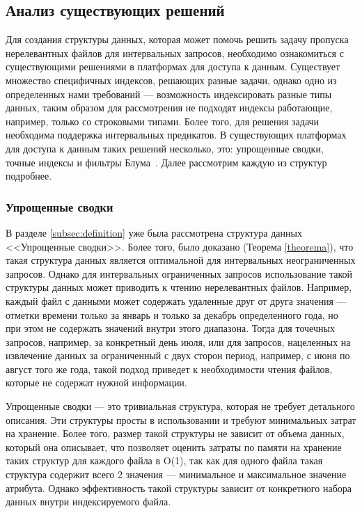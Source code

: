 \subsection{Анализ существующих решений}\label{subsec:indexes}

Для создания структуры данных, которая может помочь решить задачу пропуска нерелевантных файлов для интервальных запросов, необходимо ознакомиться с существующими решениями в платформах для доступа к данным. Существует множество специфичных индексов, решающих разные задачи, однако одно из определенных нами требований --- возможность индексировать разные типы данных, таким образом для рассмотрения не подходят индексы работающие, например, только со строковыми типами. Более того, для решения задачи необходима поддержка интервальных предикатов. В существующих платформах для доступа к данным таких решений несколько, это: упрощенные сводки, точные индексы и фильтры Блума~\cite{Extensible_data_skipping}. Далее рассмотрим каждую из структур подробнее.

\subsubsection{Упрощенные сводки}\label{subsubsec:column_stats}

В разделе \ref{subsec:definition} уже была рассмотрена структура данных {<<Упрощенные сводки>>}. Более того, было доказано (Теорема \ref{theorema}), что такая структура данных является оптимальной для интервальных неограниченных запросов. Однако для интервальных ограниченных запросов использование такой структуры данных может приводить к чтению нерелевантных файлов. Например, каждый файл с данными может содержать удаленные друг от друга значения --- отметки времени только за январь и только за декабрь определенного года, но при этом не содержать значений внутри этого диапазона. Тогда для точечных запросов, например, за конкретный день июля, или для запросов, нацеленных на извлечение данных за ограниченный с двух сторон период, например, с июня по август того же года, такой подход приведет к необходимости чтения файлов, которые не содержат нужной информации.

Упрощенные сводки --- это тривиальная структура, которая не требует детального описания. Эти структуры просты в использовании и требуют минимальных затрат на хранение. Более того, размер такой структуры не зависит от объема данных, который она описывает, что позволяет оценить затраты по памяти на хранение таких структур для каждого файла в O(1), так как для одного файла такая структура содержит всего 2 значения --- минимальное и максимальное значение атрибута. Однако эффективность такой структуры зависит от конкретного набора данных внутри индексируемого файла.

